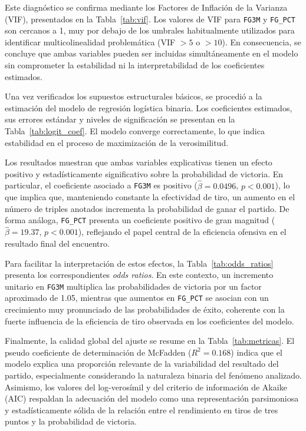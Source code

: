 \documentclass[12pt]{article}
\begin{document}
Este diagnóstico se confirma mediante los Factores de Inflación de la Varianza
(VIF), presentados en la Tabla~\ref{tab:vif}. Los valores de VIF para
\texttt{FG3M} y \texttt{FG\_PCT} son cercanos a 1, muy por debajo de los umbrales
habitualmente utilizados para identificar multicolinealidad problemática
(VIF $> 5$ o $> 10$). En consecuencia, se concluye que ambas variables pueden ser
incluidas simultáneamente en el modelo sin comprometer la estabilidad ni la
interpretabilidad de los coeficientes estimados.

Una vez verificados los supuestos estructurales básicos, se procedió a la
estimación del modelo de regresión logística binaria. Los coeficientes estimados,
sus errores estándar y niveles de significación se presentan en la
Tabla~\ref{tab:logit_coef}. El modelo converge correctamente, lo que indica
estabilidad en el proceso de maximización de la verosimilitud.

Los resultados muestran que ambas variables explicativas tienen un efecto positivo
y estadísticamente significativo sobre la probabilidad de victoria. En particular,
el coeficiente asociado a \texttt{FG3M} es positivo
($\hat{\beta} = 0.0496$, $p < 0.001$), lo que implica que, manteniendo constante la
efectividad de tiro, un aumento en el número de triples anotados incrementa la
probabilidad de ganar el partido. De forma análoga, \texttt{FG\_PCT} presenta un
coeficiente positivo de gran magnitud
($\hat{\beta} = 19.37$, $p < 0.001$), reflejando el papel central de la eficiencia
ofensiva en el resultado final del encuentro.

Para facilitar la interpretación de estos efectos, la Tabla~\ref{tab:odds_ratios}
presenta los correspondientes \emph{odds ratios}. En este contexto, un incremento
unitario en \texttt{FG3M} multiplica las probabilidades de victoria por un factor
aproximado de 1.05, mientras que aumentos en \texttt{FG\_PCT} se asocian con un
crecimiento muy pronunciado de las probabilidades de éxito, coherente con la fuerte
influencia de la eficiencia de tiro observada en los coeficientes del modelo.

Finalmente, la calidad global del ajuste se resume en la
Tabla~\ref{tab:metricas}. El pseudo coeficiente de determinación de McFadden
($R^2 = 0.168$) indica que el modelo explica una proporción relevante de la
variabilidad del resultado del partido, especialmente considerando la naturaleza
binaria del fenómeno analizado. Asimismo, los valores del log-verosímil y del
criterio de información de Akaike (AIC) respaldan la adecuación del modelo como una
representación parsimoniosa y estadísticamente sólida de la relación entre el
rendimiento en tiros de tres puntos y la probabilidad de victoria.
\end{document}

